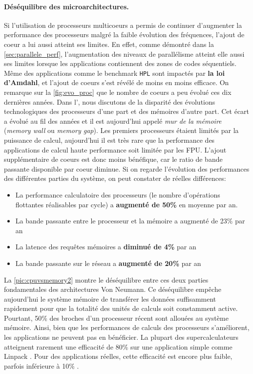         \paragraph{Déséquilibre des microarchitectures.}  
        Si l'utilisation de processeurs multicoeurs a permis de continuer d'augmenter la performance des processeurs malgré la faible évolution des fréquences, l'ajout de coeur a lui aussi atteint ses limites. En effet, comme démontré dans la \autoref{sec:parallele_perf}, l'augmentation des niveaux de parallélisme atteint elle aussi ses limites lorsque les applications contiennent des zones de codes séquentiels. Même des applications comme le benchmark \verb|HPL| sont impactés par \textbf{la loi d'Amdahl}, et l'ajout de coeurs s'est révélé de moins en moins efficace. On remarque sur la \autoref{fig:evo_proc} que le nombre de coeurs a peu évolué ces dix dernières années. Dans l', nous discutons de la disparité des évolutions technologiques des processeurs d'une part et des mémoires d'autre part. Cet écart a évolué au fil des années et il est aujourd'hui appelé \textit{mur de la mémoire} \cite{Rojas1997}  (\textit{memory wall} ou \textit{memory gap}). Les premiers processeurs étaient limités par la puissance de calcul, aujourd'hui il est très rare que la performance des applications de calcul haute performance soit limitée par les FPU. L'ajout supplémentaire de coeurs est donc moins bénéfique, car le ratio de bande passante disponible par coeur diminue. 
        Si on regarde l'évolution des performances des différentes parties du système, on peut constater de réelles différences:             
        \begin{itemize}                 
            \item La performance calculatoire des processeurs (le nombre d'opérations flottantes réalisables par cycle) a \textbf{augmenté de 50\%} en moyenne par an.
            \item La bande passante entre le processeur et la mémoire a augmenté de 23\% par an                 
            \item La latence des requêtes mémoires a \textbf{diminué de 4\% } par an                 
            \item La bande passante sur le réseau a \textbf{augmenté de 20\%} par an             
        \end{itemize}
            
            La \autoref{pic:cpuvsmemory2} montre le déséquilibre entre ces deux parties fondamentales des architectures Von Neumann. Ce déséquilibre empêche aujourd'hui le système mémoire de transférer les données suffisamment rapidement pour que la totalité des unités de calculs soit constamment active. Pourtant, 50\% des broches d'un processeur récent sont allouées au système mémoire. Ainsi, bien que les performances de calculs des processeurs s'améliorent, les applications ne peuvent pas en bénéficier. La plupart des supercalculateurs atteignent rarement une efficacité de 80\% sur une application simple comme Linpack \cite{Dongarra2003}. Pour des applications réelles, cette efficacité est encore plus faible, parfois inférieure à 10\% \cite{Oliker2005}.
            
